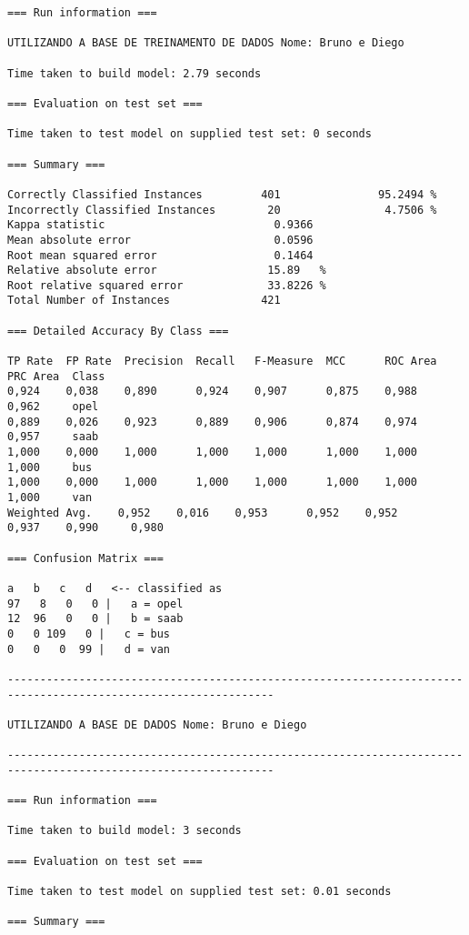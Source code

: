 \documentclass[
	article,			%
	11pt,				%
	oneside,			%
	a4paper,			%
	english,			%
	brazil,				%
	sumario=tradicional
	]{abntex2}
\begin{document}
\begin{lstlisting}
=== Run information ===

UTILIZANDO A BASE DE TREINAMENTO DE DADOS Nome: Bruno e Diego

Time taken to build model: 2.79 seconds

=== Evaluation on test set ===

Time taken to test model on supplied test set: 0 seconds

=== Summary ===

Correctly Classified Instances         401               95.2494 %
Incorrectly Classified Instances        20                4.7506 %
Kappa statistic                          0.9366
Mean absolute error                      0.0596
Root mean squared error                  0.1464
Relative absolute error                 15.89   %
Root relative squared error             33.8226 %
Total Number of Instances              421     

=== Detailed Accuracy By Class ===

TP Rate  FP Rate  Precision  Recall   F-Measure  MCC      ROC Area  PRC Area  Class
0,924    0,038    0,890      0,924    0,907      0,875    0,988     0,962     opel
0,889    0,026    0,923      0,889    0,906      0,874    0,974     0,957     saab
1,000    0,000    1,000      1,000    1,000      1,000    1,000     1,000     bus
1,000    0,000    1,000      1,000    1,000      1,000    1,000     1,000     van
Weighted Avg.    0,952    0,016    0,953      0,952    0,952      0,937    0,990     0,980     

=== Confusion Matrix ===

a   b   c   d   <-- classified as
97   8   0   0 |   a = opel
12  96   0   0 |   b = saab
0   0 109   0 |   c = bus
0   0   0  99 |   d = van

---------------------------------------------------------------------------------------------------------------

UTILIZANDO A BASE DE DADOS Nome: Bruno e Diego

---------------------------------------------------------------------------------------------------------------

=== Run information ===

Time taken to build model: 3 seconds

=== Evaluation on test set ===

Time taken to test model on supplied test set: 0.01 seconds

=== Summary ===


\end{lstlisting}
\end{document}
